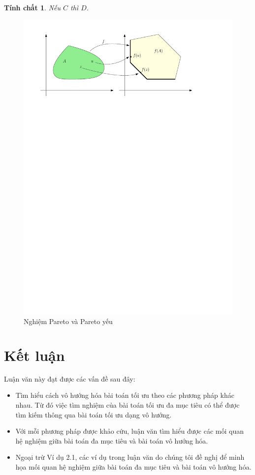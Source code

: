 \documentclass[12pt,a4paper]{report}
\newtheorem{tc}{Tính chất}[chapter]
\begin{document}
\begin{tc}{\rm \cite[Định lý 2.7]{Sonkim}} Nếu $C$ thì $D$.
\end{tc}


\begin{figure}[h]
\begin{center}
\includegraphics[width=0.9\linewidth]{nghiemtoiuu}
\caption{Nghiệm Pareto và Pareto yếu}
\end{center}
\end{figure}




\chapter*{Kết luận}                         %
\indent
\thispagestyle{fancy}

Luận văn này đạt được các vấn đề sau đây:

\begin{itemize}
	\item Tìm hiểu cách vô hướng hóa bài toán tối ưu theo các phương pháp khác nhau. Từ đó việc tìm nghiệm của bài toán tối ưu đa mục tiêu có thể được tìm kiếm thông qua bài toán tối ưu dạng vô hướng.
	\item Với mỗi phương pháp được khảo cứu, luận văn tìm hiểu được các mối quan hệ nghiệm giữa bài toán đa mục tiêu và bài toán vô hướng hóa.
	\item Ngoại trừ Ví dụ 2.1, các ví dụ trong luận văn do chúng tôi đề nghị để minh họa mối quan hệ nghiệm giữa bài toán đa mục tiêu và bài toán vô hướng hóa.
	
\end{itemize}
\end{document}
